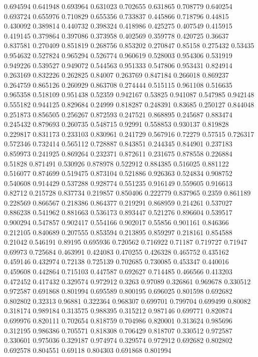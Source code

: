 0.694594 0.641948
0.693964 0.631023
0.702655 0.631865
0.708779 0.640254
0.693724 0.655976
0.710829 0.655356
0.733837 0.445866
0.718796 0.44815
0.430092 0.389814
0.440732 0.398324
0.418986 0.425275
0.407549 0.415915
0.419145 0.379864
0.397086 0.373958
0.402569 0.359778
0.420725 0.36637
0.837581 0.270409
0.851819 0.268756
0.853202 0.270847
0.85158 0.275432
0.53435 0.954632
0.527824 0.965294
0.526774 0.960619
0.528003 0.954306
0.531919 0.949226
0.539527 0.949072
0.544563 0.951333
0.547806 0.953431
0.824914 0.263169
0.832226 0.262825
0.84007 0.263769
0.847184 0.266018
0.869237 0.264759
0.865126 0.260929
0.863708 0.274444
0.515115 0.961108
0.516635 0.965358
0.518109 0.951438
0.52359 0.942167
0.53825 0.941087
0.547985 0.942148
0.555182 0.944125
0.829684 0.24999
0.818287 0.248391
0.83685 0.250127
0.844048 0.251873
0.856505 0.256267
0.872593 0.247521
0.868895 0.245687
0.883474 0.245432
0.879693 0.260735
0.548715 0.92991
0.558853 0.930137
0.819828 0.229817
0.831173 0.233103
0.830961 0.241729
0.567916 0.72279
0.57515 0.726317
0.572346 0.732414
0.565112 0.728887
0.843851 0.244345
0.844901 0.237183
0.859973 0.241925
0.869264 0.232371
0.872611 0.231675
0.878558 0.226884
0.51828 0.871491
0.530926 0.878978
0.522912 0.884385
0.516025 0.881122
0.516077 0.874699
0.519475 0.873104
0.521886 0.926363
0.524834 0.908752
0.540608 0.914429
0.537288 0.928774
0.551235 0.916149
0.559605 0.916613
0.82712 0.215728
0.837734 0.219857
0.850406 0.222779
0.837965 0.2359
0.861189 0.228569
0.866567 0.218386
0.864377 0.219291
0.868959 0.214261
0.537027 0.886238
0.541962 0.881663
0.536173 0.893447
0.521276 0.896604
0.539517 0.900294
0.547857 0.902417
0.554166 0.902017
0.55856 0.901161
0.846366 0.212105
0.840689 0.207555
0.853594 0.213895
0.859297 0.218161
0.854588 0.21042
0.546191 0.89195
0.695936 0.720562
0.716922 0.71187
0.719727 0.71947
0.69973 0.725684
0.463991 0.424083
0.470255 0.426328
0.465752 0.435162
0.459146 0.432974
0.72138 0.725139
0.702685 0.730085
0.453347 0.440016
0.459608 0.442864
0.715103 0.447587
0.692627 0.714485
0.466566 0.413203
0.472452 0.417432
0.329574 0.972912
0.3263 0.97089
0.326861 0.969678
0.330512 0.972587
0.691868 0.801994
0.695589 0.800195
0.696025 0.801598
0.692682 0.802802
0.32313 0.96881
0.322364 0.968307
0.699701 0.799704
0.699499 0.80082
0.318174 0.989184
0.313575 0.988395
0.315212 0.987146
0.699771 0.820874
0.699976 0.820111
0.702654 0.818759
0.704986 0.820001
0.313624 0.985696
0.312195 0.986386
0.705571 0.818308
0.706429 0.818707
0.330512 0.972587
0.330601 0.975036
0.329187 0.974974
0.329574 0.972912
0.692682 0.802802
0.692578 0.804551
0.69118 0.804303
0.691868 0.801994
